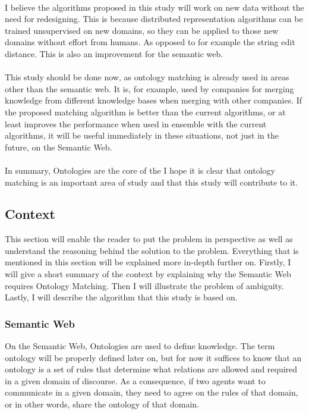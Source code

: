 \documentclass{article}
\begin{document}
 \paragraph{}
 I believe the algorithms proposed in this study will work on new data without the need for redesigning. This is because distributed representation algorithms can be trained unsupervised on new domains, so they can be applied to those new domains without effort from humans. As opposed to for example the string edit distance. This is also an improvement for the semantic web.
 \paragraph{}
 This study should be done now, as ontology matching is already used in areas other than the semantic web. It is, for example, used by companies for merging knowledge from different knowledge bases when merging with other companies. If the proposed matching algorithm is better than the current algorithms, or at least improves the performance when used in ensemble with the current algorithms, it will be useful immediately in these situations, not just in the future, on the Semantic Web.
 \paragraph{}
 In summary, Ontologies are the core of the I hope it is clear that ontology matching is an important area of study and that this study will contribute to it.

 \subsection{Context}
 This section will enable the reader to put the problem in perspective as well as understand the reasoning behind the solution to the problem. Everything that is mentioned in this section will be explained more in-depth further on.
 Firstly, I will give a short summary of the context by explaining why the Semantic Web requires Ontology Matching. Then I will illustrate the problem of ambiguity. Lastly, I will describe the algorithm that this study is based on.

 \subsubsection{Semantic Web}
 On the Semantic Web, Ontologies are used to define knowledge\cite{fensel2001ontologies}.
 The term ontology will be properly defined later on, but for now it suffices to know that an ontology is a set of rules that determine what relations are allowed and required in a given domain of discourse. As a consequence, if two agents want to communicate in a given domain, they need to agree on the rules of that domain, or in other words, share the ontology of that domain.
\end{document}
